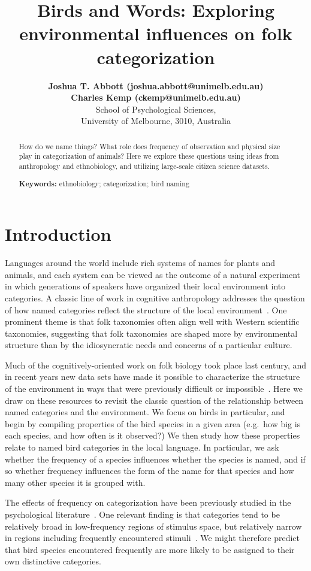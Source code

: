 \documentclass[10pt,letterpaper]{article}
\title{Birds and Words: Exploring environmental influences on folk categorization}
\author{{\large \bf Joshua T. Abbott (joshua.abbott@unimelb.edu.au)} \\
 {\large \bf Charles Kemp (ckemp@unimelb.edu.au)} \\
  School of Psychological Sciences,  \\
  University of Melbourne, 3010, Australia}
\begin{document}
\maketitle


\begin{abstract}
How do we name things? What role does frequency of observation and physical size play in categorization of animals? Here we explore these questions using ideas from anthropology and ethnobiology, and utilizing large-scale citizen science datasets.

\textbf{Keywords:} 
ethnobiology; categorization; bird naming
\end{abstract}


\section{Introduction}

Languages around the world include rich systems of names for plants and animals, and each system can be viewed as the outcome of a natural experiment in which generations of speakers have organized their local environment into categories. A classic line of work in cognitive anthropology addresses the question of how named categories reflect the structure of the local environment~\cite{berlin2014ethnobiological}. One prominent theme is that folk taxonomies often align well with Western scientific taxonomies, suggesting that folk taxonomies are shaped more by environmental structure than by the idiosyncratic needs and concerns of a particular culture. 

Much of the cognitively-oriented work on folk biology took place last century, and in recent years new data sets have made it possible to characterize the structure of the environment in ways that were previously difficult or impossible~\cite{sullivan2009ebird,wilman2014eltontraits}. Here we draw on these resources to revisit the classic question of the relationship between named categories and the environment. We focus on birds in particular, and begin by compiling properties of the bird species in a given area (e.g.\ how big is each species, and how often is it observed?) We then study how these properties relate to named bird categories in the local language. In particular, we ask whether the frequency of a species influences whether the species is named, and if so whether frequency influences the form of the name for that species and how many other species it is grouped with. 

The effects of frequency on categorization have been previously studied in the psychological literature~\cite{parducci83,nosofsky88,barsalouhl98}.  One relevant finding is that categories tend to be relatively broad in low-frequency regions of stimulus space, but relatively narrow in regions including frequently encountered stimuli~\cite{parducci83}. We might therefore predict that bird species encountered frequently are more likely to be assigned to their own distinctive categories.  
\end{document}
